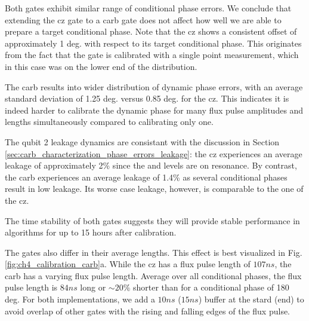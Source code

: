 Both gates exhibit similar range of conditional phase errors. We conclude that extending the \gls{cz} gate to a \gls{carb} gate does not affect how well we are able to prepare a target conditional phase. Note that the \gls{cz} shows a consistent offset of approximately 1 deg. with respect to its target conditional phase. This originates from the fact that the gate is calibrated with a single point measurement, which in this case was on the lower end of the distribution. 

The \gls{carb} results into wider distribution of dynamic phase errors, with an average standard deviation of 1.25 deg. versus 0.85 deg. for the \gls{cz}. This indicates it is indeed harder to calibrate the dynamic phase for many flux pulse amplitudes and lengths simultaneously compared to calibrating only one.

The qubit 2 leakage dynamics are consistant with the discussion in Section \ref{sec:carb_characterization_phase_errors_leakage}: the \gls{cz} experiences an average leakage of approximately 2\% since the \oo and \tz levels are on resonance. By contrast, the \gls{carb} experiences an average leakage of 1.4\% as several conditional phases result in low leakage. Its worse case leakage, however, is comparable to the one of the \gls{cz}. 

The time stability of both gates suggests they will provide stable performance in algorithms for up to 15 hours after calibration.

The gates also differ in their average lengths. This effect is best visualized in Fig. \ref{fig:ch4_calibration_carb}a. While the \gls{cz} has a flux pulse length of $107\unit{ns}$, the \gls{carb} has a varying flux pulse length. Average over all conditional phases, the flux pulse length is $84\unit{ns}$ long or $\sim 20\%$ shorter than for a conditional phase of 180 deg. For both implementations, we add a $10\unit{ns}$ ($15\unit{ns}$) buffer at the stard (end) to avoid overlap of other gates with the rising and falling edges of the flux pulse.

